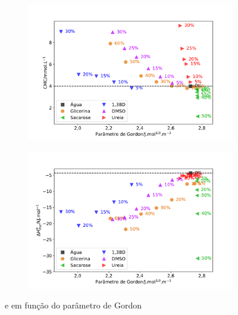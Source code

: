 		\begin{figure}[h]
			\begin{subfigure}[t]{0.5\textwidth}
				\centering
				\includegraphics[width=\textwidth]{imagens/itc/CMC_por_G}
				\caption{\cmc}
				\label{fig:cmc_por_g}
			\end{subfigure} %
			\begin{subfigure}[t]{0.5\textwidth}
				\centering
				\includegraphics[width=\linewidth]{imagens/itc/DH_por_G}
				\caption{\DHmic}
				\label{fig:dh_por_g}
			\end{subfigure}
			\caption{\cmc{} e \DHmic{} em função do parâmetro de Gordon}
			\label{fig:cmc_dh_por_g}
		\end{figure}
		
